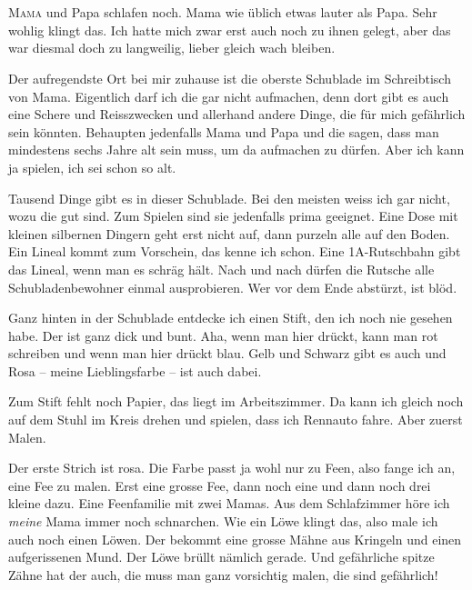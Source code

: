 \chapter*{}
\lettrine[lines=3]{\color{red}M}{ama} und Papa schlafen noch. Mama wie üblich etwas lauter als Papa.  Sehr wohlig klingt das. Ich hatte mich zwar erst auch noch zu ihnen gelegt, aber das war diesmal doch zu langweilig, lieber gleich wach bleiben. 

Der aufregendste Ort bei mir zuhause ist die oberste Schublade im Schreibtisch von Mama. Eigentlich darf ich die gar nicht aufmachen, denn dort gibt es auch eine Schere und Reisszwecken und allerhand andere Dinge, die für mich gefährlich sein könnten. Behaupten jedenfalls Mama und Papa und die sagen, dass man mindestens sechs Jahre alt sein muss, um da aufmachen zu dürfen. Aber ich kann ja spielen, ich sei schon so alt. 

Tausend Dinge gibt es in dieser Schublade. Bei den meisten weiss ich gar nicht, wozu die gut sind. Zum Spielen sind sie jedenfalls prima geeignet. Eine Dose mit kleinen silbernen Dingern geht erst nicht auf, dann purzeln alle auf den Boden. Ein Lineal kommt zum Vorschein, das kenne ich schon. Eine 1A-Rutschbahn gibt das Lineal, wenn man es schräg hält. Nach und nach dürfen die Rutsche alle Schubladenbewohner einmal ausprobieren. Wer vor dem Ende abstürzt, ist blöd. 

Ganz hinten in der Schublade entdecke ich einen Stift, den ich noch nie gesehen habe. Der ist ganz dick und bunt. Aha, wenn man hier drückt, kann man rot schreiben und wenn man hier drückt blau. Gelb und Schwarz gibt es auch und Rosa -- meine Lieblingsfarbe -- ist auch dabei.

Zum Stift fehlt noch Papier, das liegt im Arbeitszimmer. Da kann ich gleich noch auf dem Stuhl im Kreis drehen und spielen, dass ich Rennauto fahre. Aber zuerst Malen. 

Der erste Strich ist rosa. Die Farbe passt ja wohl nur zu Feen, also fange ich an, eine Fee zu malen. Erst eine grosse Fee, dann noch eine und dann noch drei kleine dazu. Eine Feenfamilie mit zwei Mamas. Aus dem Schlafzimmer höre ich \emph{meine} Mama immer noch schnarchen. Wie ein Löwe klingt das, also male ich auch noch einen Löwen. Der bekommt eine grosse Mähne aus Kringeln und einen aufgerissenen Mund. Der Löwe brüllt nämlich gerade. Und gefährliche spitze Zähne hat der auch, die muss man ganz vorsichtig malen, die sind gefährlich!

